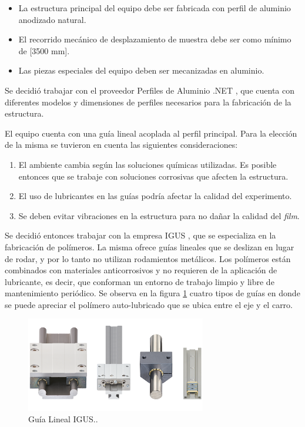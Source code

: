 \begin{itemize}
\item La estructura principal del equipo debe ser fabricada con perfil de aluminio anodizado natural.
\item El recorrido mecánico de desplazamiento de muestra debe ser como mínimo de [3500 mm].
\item Las piezas especiales del equipo deben ser mecanizadas en aluminio.

\end{itemize}

Se decidió trabajar con el proveedor Perfiles de Aluminio .NET \citep{web_perfiles_net}, que cuenta con diferentes modelos y dimensiones de perfiles necesarios para la fabricación de la estructura.

El equipo cuenta con una guía lineal acoplada al perfil principal. Para la elección de la misma se tuvieron en cuenta las siguientes consideraciones:

\begin{enumerate}
\item El ambiente cambia  según las soluciones químicas utilizadas. Es posible entonces que se trabaje con soluciones corrosivas que afecten la estructura.  
\item El uso de lubricantes en las guías podría afectar la calidad del experimento.
\item Se deben evitar vibraciones en la estructura para no dañar la calidad del \textit{film}.

\end{enumerate}

Se decidió entonces trabajar con la empresa IGUS \citep{web_igus}, que se especializa en la fabricación de polímeros. La misma ofrece guías lineales que se deslizan en lugar de rodar, y por lo tanto no utilizan rodamientos metálicos. Los polímeros están combinados con materiales anticorrosivos y no requieren de la aplicación de lubricante, es decir, que conforman un entorno de trabajo limpio y libre de mantenimiento periódico. Se observa en la figura \ref{fig:equipo_mecánico} cuatro tipos de guías en donde se puede apreciar el polímero auto-lubricado que se ubica entre el eje y el carro.

\begin{figure}[ht]
\centering 
\includegraphics[width=0.7\textwidth]{./Figures/guias.png}
\caption{Guía Lineal IGUS.\protect\footnotemark.}
\label{fig:equipo_mecánico}
\end{figure}



